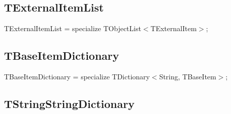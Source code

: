 \documentclass{report}
\newif\ifpdf
\begin{document}
\subsection*{TExternalItemList}
\fi
\label{PasDoc_Items-TExternalItemList}
\begin{list}{}{
\setlength{\itemindent}{0cm}
\setlength{\listparindent}{0cm}
\setlength{\leftmargin}{\evensidemargin}
\addtolength{\leftmargin}{\tmplength}
\settowidth{\labelsep}{X}
\addtolength{\leftmargin}{\labelsep}
\setlength{\labelwidth}{\tmplength}
}
\item[\textbf{Declaration}\hfill]
\ifpdf
\begin{flushleft}
\fi
\begin{ttfamily}
TExternalItemList = specialize TObjectList{$<$}TExternalItem{$>$};\end{ttfamily}

\ifpdf
\end{flushleft}
\fi

\end{list}
\ifpdf
\subsection*{\large{\textbf{TBaseItemDictionary}}\normalsize\hspace{1ex}\hrulefill}
\else
\subsection*{TBaseItemDictionary}
\fi
\label{PasDoc_Items-TBaseItemDictionary}
\begin{list}{}{
\setlength{\itemindent}{0cm}
\setlength{\listparindent}{0cm}
\setlength{\leftmargin}{\evensidemargin}
\addtolength{\leftmargin}{\tmplength}
\settowidth{\labelsep}{X}
\addtolength{\leftmargin}{\labelsep}
\setlength{\labelwidth}{\tmplength}
}
\item[\textbf{Declaration}\hfill]
\ifpdf
\begin{flushleft}
\fi
\begin{ttfamily}
TBaseItemDictionary = specialize TDictionary{$<$}String, TBaseItem{$>$};\end{ttfamily}

\ifpdf
\end{flushleft}
\fi

\end{list}
\ifpdf
\subsection*{\large{\textbf{TStringStringDictionary}}\normalsize\hspace{1ex}\hrulefill}
\else
\end{document}

